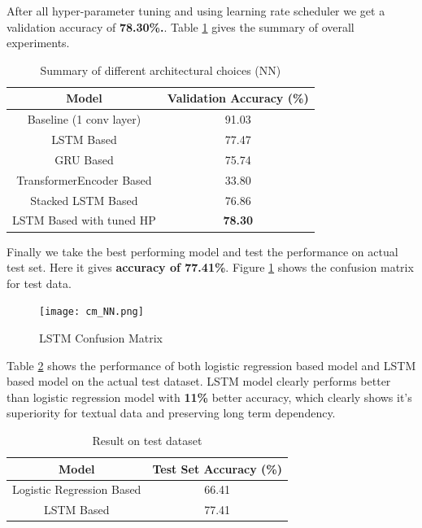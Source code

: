 \documentclass[10pt,a4paper]{article}
\begin{document}
After all hyper-parameter tuning and using learning rate scheduler we get a validation accuracy of \textbf{78.30\%.}. Table \ref{table:2} gives the summary of overall experiments.

\begin{table}[h!]
\centering
\begin{tabular}{|c| c|} 
 \hline
 Model & Validation Accuracy (\%) \\
 \hline\hline
 Baseline (1 conv layer) & 91.03 \\ 
 \hline
LSTM Based & 77.47 \\ 
 \hline
 GRU Based & 75.74 \\ 
 \hline
TransformerEncoder Based & 33.80 \\ 
 \hline
Stacked LSTM Based  & 76.86 \\ 
 \hline
LSTM Based with tuned HP & \textbf{78.30} \\ 
 \hline
\end{tabular}
\caption{Summary of different architectural choices (NN) }
\label{table:2}
\end{table}

Finally we take the best performing model and test the performance on actual test set. Here it gives \textbf{accuracy of 77.41\%}. Figure \ref{nncm} shows the confusion matrix for test data. 

\begin{figure}[h!]
	\texttt{[image: cm\_NN.png]}
	\caption{LSTM Confusion Matrix}
	\label{nncm}
\end{figure}


Table \ref{table:3} shows the performance of both logistic regression based model and LSTM based model on the actual test dataset. LSTM model clearly performs better than logistic regression model with \textbf{11\%} better accuracy, which clearly shows it's superiority for textual data and preserving long term dependency.

\begin{table}[h!]
\centering
\begin{tabular}{|c| c|} 
 \hline
 Model & Test Set Accuracy (\%) \\
 \hline\hline
Logistic Regression Based & 66.41 \\ 
 \hline
LSTM Based & 77.41 \\ 
 \hline

\end{tabular}
\caption{Result on test dataset }
\label{table:3}
\end{table}




\end{document}
